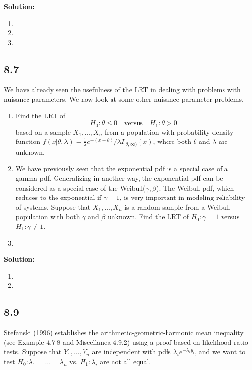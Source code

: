 \documentclass[11pt]{article}
\newcommand{\Sol}{\par {\bf Solution:}}
\newcommand{\sample}[1]{#1_1 , \dots , #1_n}
\begin{document}
\Sol

\begin{enumerate}[label=(\alph*)]
    \item
    \item
    \item
\end{enumerate}

\subsection*{8.7}
We have already seen the usefulness of the LRT in dealing with problems with nuisance
parameters. We now look at some other nuisance parameter problems.

\begin{enumerate}[label=(\alph*)]
    \item Find the LRT of 
    \[
    H_0: \theta \le 0 \quad \text{versus} \quad H_1: \theta > 0
    \]
    based on a sample $\sample{X}$ from a population with probability density function $f(x|\theta, \lambda) = \frac{1}{\lambda}e^{-(x-\theta)}/\lambda I_{[\theta, \infty)}(x)$, where both $\theta$ and $\lambda$ are unknown.
    \item We have previously seen that the exponential pdf is a special case of a gamma pdf. Generalizing in another way, the exponential pdf can be considered as a special case of the Weibull($\gamma, \beta$). The Weibull pdf, which reduces to the exponential if $\gamma = 1$, is very important in modeling reliability of systems. Suppose that $\sample{X}$ is a random sample from a Weibull population with both $\gamma$ and $\beta$ unknown. Find the LRT of $H_0: \gamma = 1$ versus $H_1: \gamma \neq 1$.
    \item
\end{enumerate}

\Sol

\begin{enumerate}[label=(\alph*)]
    \item
    \item
\end{enumerate}

\subsection*{8.9}

Stefanski (1996) establishes the arithmetic-geometric-harmonic mean inequality (see Example 4.7.8 and Miscellanea 4.9.2) using a proof based on likelihood ratio tests. Suppose that $\sample{Y}$ are independent with pdfs $\lambda_ie^{-\lambda_iy_i}$, and we want to test $H_0: \lambda_1 = \dots = \lambda_n$ vs. $H_1: \lambda_i$ are not all equal.
\end{document}

